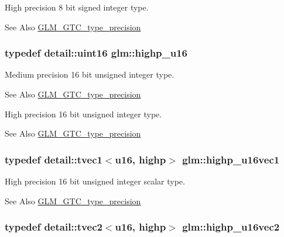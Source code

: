 High precision 8 bit signed integer type. \begin{DoxySeeAlso}{See Also}
\hyperlink{group__gtc__type__precision}{G\-L\-M\-\_\-\-G\-T\-C\-\_\-type\-\_\-precision} 
\end{DoxySeeAlso}
\hypertarget{group__gtc__type__precision_ga9da2178d7501d9c0f225fa1a7b70cb45}{
\subsubsection[{highp\-\_\-u16}]{\setlength{\rightskip}{0pt plus 5cm}typedef detail\-::uint16 {\bf glm\-::highp\-\_\-u16}}}\label{group__gtc__type__precision_ga9da2178d7501d9c0f225fa1a7b70cb45}
Medium precision 16 bit unsigned integer type. \begin{DoxySeeAlso}{See Also}
\hyperlink{group__gtc__type__precision}{G\-L\-M\-\_\-\-G\-T\-C\-\_\-type\-\_\-precision}
\end{DoxySeeAlso}
High precision 16 bit unsigned integer type. \begin{DoxySeeAlso}{See Also}
\hyperlink{group__gtc__type__precision}{G\-L\-M\-\_\-\-G\-T\-C\-\_\-type\-\_\-precision} 
\end{DoxySeeAlso}
\hypertarget{group__gtc__type__precision_gac4a83dec879b77ab0055c8da232da066}{
\subsubsection[{highp\-\_\-u16vec1}]{\setlength{\rightskip}{0pt plus 5cm}typedef detail\-::tvec1$<$u16, highp$>$ {\bf glm\-::highp\-\_\-u16vec1}}}\label{group__gtc__type__precision_gac4a83dec879b77ab0055c8da232da066}
High precision 16 bit unsigned integer scalar type. \begin{DoxySeeAlso}{See Also}
\hyperlink{group__gtc__type__precision}{G\-L\-M\-\_\-\-G\-T\-C\-\_\-type\-\_\-precision} 
\end{DoxySeeAlso}
\hypertarget{group__gtc__type__precision_gafad4245d389a4990eb505cd74a2d0a6f}{
\subsubsection[{highp\-\_\-u16vec2}]{\setlength{\rightskip}{0pt plus 5cm}typedef detail\-::tvec2$<$u16, highp$>$ {\bf glm\-::highp\-\_\-u16vec2}}}\label{group__gtc__type__precision_gafad4245d389a4990eb505cd74a2d0a6f}
